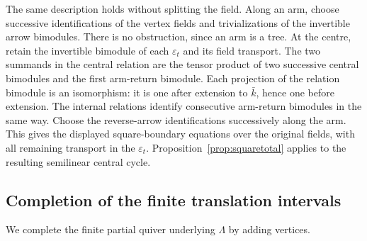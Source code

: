 The same description holds without splitting the field. Along an arm, choose successive identifications of the vertex fields and trivializations of the invertible arrow bimodules. There is no obstruction, since an arm is a tree. At the centre, retain the invertible bimodule of each $\varepsilon_t$ and its field transport. The two summands in the central relation are the tensor product of two successive central bimodules and the first arm-return bimodule. Each projection of the relation bimodule is an isomorphism: it is one after extension to $\bar k$, hence one before extension. The internal relations identify consecutive arm-return bimodules in the same way. Choose the reverse-arrow identifications successively along the arm. This gives the displayed square-boundary equations over the original fields, with all remaining transport in the $\varepsilon_t$. Proposition~\ref{prop:squaretotal} applies to the resulting semilinear central cycle.

\subsection{Completion of the finite translation intervals}

We complete the finite partial quiver underlying $\Lambda$ by adding vertices.

